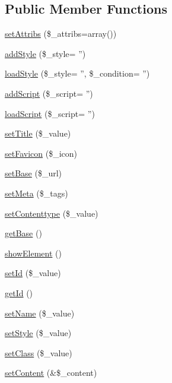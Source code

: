 \subsection*{Public Member Functions}
\begin{DoxyCompactItemize}
\item 
\hyperlink{classDocument_aa41033600cf656074f7f5f7c6666d4f2}{setAttribs} (\$\_\-attribs=array())
\item 
\hyperlink{classDocument_a11fb4959fcf6fd570e00d09dd572ca61}{addStyle} (\$\_\-style= '')
\item 
\hyperlink{classDocument_a90810fa2ea28179748a865531c7fc263}{loadStyle} (\$\_\-style= '', \$\_\-condition= '')
\item 
\hyperlink{classDocument_a0e77dfc94e5f3572a2fc912b704378c8}{addScript} (\$\_\-script= '')
\item 
\hyperlink{classDocument_a9e088502436fe985b501cb5650ab022d}{loadScript} (\$\_\-script= '')
\item 
\hyperlink{classDocument_acf134e4b0894a2a8ad1757b17f18bd9e}{setTitle} (\$\_\-value)
\item 
\hyperlink{classDocument_afca18e2b74a78d2954303a96ffa3d63d}{setFavicon} (\$\_\-icon)
\item 
\hyperlink{classDocument_a4fa96cab10bfe15cd26e5c1110ddd9d7}{setBase} (\$\_\-url)
\item 
\hyperlink{classDocument_ace35c2c3f3b17e07468c740eaed49ecb}{setMeta} (\$\_\-tags)
\item 
\hyperlink{classDocument_ae9c4b59120e4b4d7064ced9f13fdf91b}{setContenttype} (\$\_\-value)
\item 
\hyperlink{classDocument_a9b42f2549537d4457c16d80368f9aea8}{getBase} ()
\item 
\hyperlink{classDocument_a20e6d0abbac866da5d651d1a49f8cf4f}{showElement} ()
\item 
\hyperlink{classBaseElement_a0c1ce3d1684ecb78960cf7a97278494e}{setId} (\$\_\-value)
\item 
\hyperlink{classBaseElement_a4a7aa583ee21af392908d7fd42fde790}{getId} ()
\item 
\hyperlink{classBaseElement_a39bafb3609d10048920c20242c2a04c5}{setName} (\$\_\-value)
\item 
\hyperlink{classBaseElement_a6b2b9ff69f6e92db82f91d9c55cda697}{setStyle} (\$\_\-value)
\item 
\hyperlink{classBaseElement_af6597b30fa9798878f6290271043dfa2}{setClass} (\$\_\-value)
\item 
\hyperlink{classBaseElement_a164a9c6e4ee68afa0ad343942ba54d28}{setContent} (\&\$\_\-content)

\end{DoxyCompactItemize}
